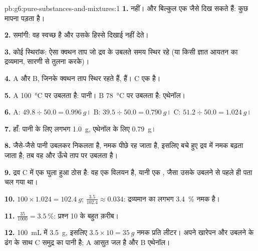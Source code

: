 \begin{solution}{pb:g6:pure-substances-and-mixtures:1}
\textbf{1.} नहीं।  और  बिल्कुल एक जैसे दिख सकते
हैं: कुछ मापना पड़ता है।

\textbf{2.} समांगी: वह स्वच्छ है और उसके हिस्से दिखाई नहीं देते।

\textbf{3.} कोई स्थिरांक: ऐसा क्वथन ताप जो द्रव के उबलते समय स्थिर
रहे (या किसी ज्ञात आयतन का द्रव्यमान, सारणी से तुलना करके)।

\textbf{4.} A और B, जिनके क्वथन ताप स्थिर रहते हैं,  हैं। C एक  है।

\textbf{5.} A \qty{100}{\celsius} पर उबलता है: पानी। B
\qty{78}{\celsius} पर उबलता है: एथेनॉल।

\textbf{6.} A: $49.8 \div 50.0 = \qty{0.996}{g}$। B: $39.5 \div 50.0 =
\qty{0.790}{g}$। C: $51.2 \div 50.0 = \qty{1.024}{g}$।

\textbf{7.} हाँ: पानी के लिए लगभग \qty{1.0}{g}, एथेनॉल के लिए
\qty{0.79}{g}।

\textbf{8.} जैसे-जैसे पानी उबलकर निकलता है, नमक पीछे रह जाता है, इसलिए बचे
हुए द्रव में नमक बढ़ता जाता है; तब वह और ऊँचे ताप पर
उबलता है।

\textbf{9.} द्रव C में एक घुला हुआ ठोस है: वह एक विलयन है, यानी एक
, जैसा उसके उबलने से पहले ही पता चल गया था।

\textbf{10.} $100 \times 1.024 = \qty{102.4}{g}$; $\frac{3.5}{102.4}
\approx 0.034$: द्रव्यमान का लगभग \qty{3.4}{\percent} नमक है।

\textbf{11.} $\frac{35}{1000} = \qty{3.5}{\percent}$: प्रश्न 10 के
बहुत क़रीब।

\textbf{12.} \qty{100}{mL} में \qty{3.5}{g}, इसलिए $3.5 \times 10 =
\qty{35}{g}$ नमक प्रति लीटर। अपने खारेपन और उबलने के ढंग के साथ C समुद्र
का पानी है; A आसुत जल है और B एथेनॉल।
\end{solution}
